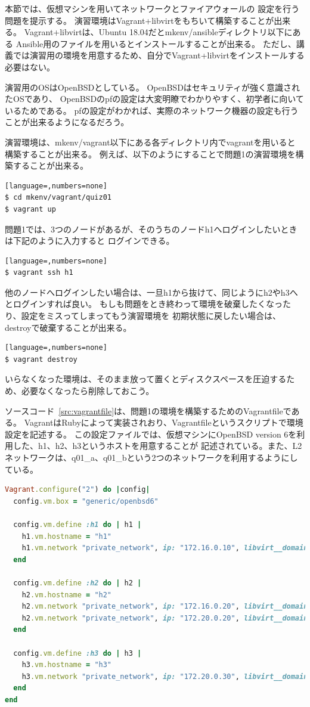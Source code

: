 
本節では、仮想マシンを用いてネットワークとファイアウォールの
設定を行う問題を提示する。
演習環境はVagrant+libvirtをもちいて構築することが出来る。
Vagrant+libvirtは、Ubuntu 18.04だとmkenv/ansibleディレクトリ以下にある
Ansible用のファイルを用いるとインストールすることが出来る。
ただし、講義では演習用の環境を用意するため、自分でVagrant+libvirtをインストールする必要はない。

演習用のOSはOpenBSDとしている。
OpenBSDはセキュリティが強く意識されたOSであり、
OpenBSDのpfの設定は大変明瞭でわかりやすく、初学者に向いているためである。
pfの設定がわかれば、実際のネットワーク機器の設定も行うことが出来るようになるだろう。

演習環境は、mkenv/vagrant以下にある各ディレクトリ内でvagrantを用いると
構築することが出来る。
例えば、以下のようにすることで問題1の演習環境を構築することが出来る。
\begin{lstlisting}[language=,numbers=none]
$ cd mkenv/vagrant/quiz01
$ vagrant up
\end{lstlisting}
問題1では、3つのノードがあるが、そのうちのノードh1へログインしたいときは下記のように入力すると
ログインできる。
\begin{lstlisting}[language=,numbers=none]
$ vagrant ssh h1
\end{lstlisting}
他のノードへログインしたい場合は、一旦h1から抜けて、同じようにh2やh3へとログインすれば良い。
もしも問題をとき終わって環境を破棄したくなったり、設定をミスってしまってもう演習環境を
初期状態に戻したい場合は、destroyで破棄することが出来る。
\begin{lstlisting}[language=,numbers=none]
$ vagrant destroy
\end{lstlisting}
いらなくなった環境は、そのまま放って置くとディスクスペースを圧迫するため、必要なくなったら削除しておこう。

ソースコード~\ref{src:vagrantfile}は、問題1の環境を構築するためのVagrantfileである。
VagrantはRubyによって実装されおり、Vagrantfileというスクリプトで環境設定を記述する。
この設定ファイルでは、仮想マシンにOpenBSD version 6を利用した、h1、h2、h3というホストを用意することが
記述されている。また、L2ネットワークは、q01\_a、q01\_bという2つのネットワークを利用するようにしている。
\begin{lstlisting}[language=Ruby,caption=演習問題1のVagrantfile,label=src:vagrantfile]
Vagrant.configure("2") do |config|
  config.vm.box = "generic/openbsd6"

  config.vm.define :h1 do | h1 |
    h1.vm.hostname = "h1"
    h1.vm.network "private_network", ip: "172.16.0.10", libvirt__domain_name: "q01_a"
  end

  config.vm.define :h2 do | h2 |
    h2.vm.hostname = "h2"
    h2.vm.network "private_network", ip: "172.16.0.20", libvirt__domain_name: "q01_a"
    h2.vm.network "private_network", ip: "172.20.0.20", libvirt__domain_name: "q01_b"
  end

  config.vm.define :h3 do | h3 |
    h3.vm.hostname = "h3"
    h3.vm.network "private_network", ip: "172.20.0.30", libvirt__domain_name: "q01_b"
  end
end
\end{lstlisting}


